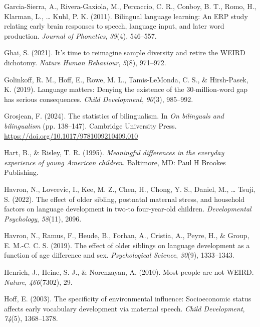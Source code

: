 \documentclass[
  man,floatsintext]{apa6}
\newlength{\cslhangindent}
\newlength{\cslentryspacingunit} %
\newenvironment{CSLReferences}[2] %
 {%
  \setlength{\parindent}{0pt}
  \ifodd #1
  \let\oldpar\par
  \def\par{\hangindent=\cslhangindent\oldpar}
  \fi
  \setlength{\parskip}{#2\cslentryspacingunit}
 }%
 {}
\begin{document}
\begin{CSLReferences}{1}{0}
\leavevmode{}%
Garcia-Sierra, A., Rivera-Gaxiola, M., Percaccio, C. R., Conboy, B. T., Romo, H., Klarman, L., \ldots{} Kuhl, P. K. (2011). Bilingual language learning: An ERP study relating early brain responses to speech, language input, and later word production. \emph{Journal of Phonetics}, \emph{39}(4), 546--557.

\leavevmode{}%
Ghai, S. (2021). It's time to reimagine sample diversity and retire the WEIRD dichotomy. \emph{Nature Human Behaviour}, \emph{5}(8), 971--972.

\leavevmode{}%
Golinkoff, R. M., Hoff, E., Rowe, M. L., Tamis-LeMonda, C. S., \& Hirsh-Pasek, K. (2019). Language matters: Denying the existence of the 30-million-word gap has serious consequences. \emph{Child Development}, \emph{90}(3), 985--992.

\leavevmode{}%
Grosjean, F. (2024). The statistics of bilingualism. In \emph{On bilinguals and bilingualism} (pp. 138--147). Cambridge University Press. \url{https://doi.org/10.1017/9781009210409.010}

\leavevmode{}%
Hart, B., \& Risley, T. R. (1995). \emph{Meaningful differences in the everyday experience of young {A}merican children.} Baltimore, MD: Paul H Brookes Publishing.

\leavevmode{}%
Havron, N., Lovcevic, I., Kee, M. Z., Chen, H., Chong, Y. S., Daniel, M., \ldots{} Tsuji, S. (2022). The effect of older sibling, postnatal maternal stress, and household factors on language development in two-to four-year-old children. \emph{Developmental Psychology}, \emph{58}(11), 2096.

\leavevmode{}%
Havron, N., Ramus, F., Heude, B., Forhan, A., Cristia, A., Peyre, H., \& Group, E. M.-C. C. S. (2019). The effect of older siblings on language development as a function of age difference and sex. \emph{Psychological Science}, \emph{30}(9), 1333--1343.

\leavevmode{}%
Henrich, J., Heine, S. J., \& Norenzayan, A. (2010). Most people are not WEIRD. \emph{Nature}, \emph{466}(7302), 29.

\leavevmode{}%
Hoff, E. (2003). The specificity of environmental influence: Socioeconomic status affects early vocabulary development via maternal speech. \emph{Child Development}, \emph{74}(5), 1368--1378.


\end{CSLReferences}
\end{document}
